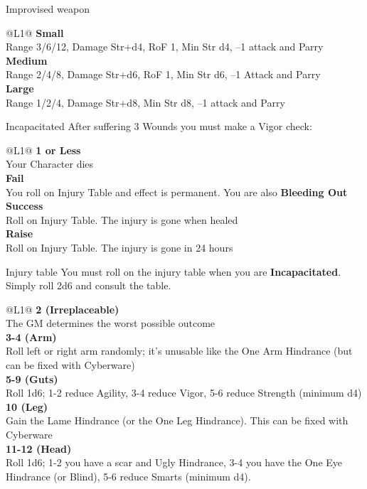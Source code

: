 \begin{genericsection}{Improvised weapon}
    \begin{redtable}{\linewidth}{@{}L{1}@{}}
      \textbf{Small}\\
      Range 3/6/12, Damage Str+d4, RoF 1, Min Str d4, –1 attack and Parry\\
      \textbf{Medium}\\
      Range 2/4/8, Damage Str+d6, RoF 1, Min Str d6, –1 Attack and Parry\\
      \textbf{Large}\\
      Range 1/2/4, Damage Str+d8, Min Str d8, –1 attack and Parry\\
    \end{redtable}
\end{genericsection}

\begin{genericsection}{Incapacitated}
\label{sec:rules-concepts-incapacitated}
After suffering 3 Wounds you must make a Vigor check:
\begin{redtable}{\linewidth}{@{}L{1}@{}}
  \textbf{1 or Less}\\
  Your Character dies\\
  \textbf{Fail}\\
  You roll on Injury Table and effect is permanent. You are also \textbf{Bleeding Out}\\
  \textbf{Success}\\
  Roll on Injury Table. The injury is gone when healed\\
  \textbf{Raise}\\
  Roll on Injury Table. The injury is gone in 24 hours\\
\end{redtable}
\end{genericsection}

\begin{genericsection}{Injury table}
You must roll on the injury table when you are \textbf{Incapacitated}. Simply roll 2d6 and consult the table.
\begin{redtable}{\linewidth}{@{}L{1}@{}}
  \textbf{2 (Irreplaceable)}\\
  The GM determines the worst possible outcome\\
  \textbf{3-4 (Arm)}\\
  Roll left or right arm randomly; it’s unusable like the One Arm Hindrance (but can be fixed with Cyberware)\\
  \textbf{5-9 (Guts)}\\
  Roll 1d6; 1-2 reduce Agility, 3-4 reduce Vigor, 5-6 reduce Strength (minimum d4)\\
  \textbf{10 (Leg)}\\
  Gain the Lame Hindrance (or the One Leg Hindrance). This can be fixed with Cyberware\\
  \textbf{11-12 (Head)}\\
  Roll 1d6; 1-2 you have a scar and Ugly Hindrance, 3-4 you have the One Eye Hindrance (or Blind), 5-6 reduce Smarts (minimum d4).
\end{redtable}
\end{genericsection}

